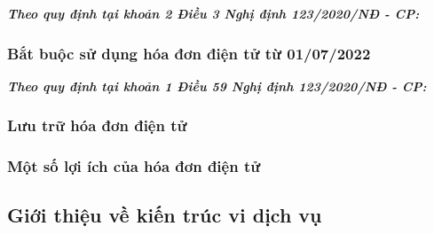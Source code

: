\documentclass{article} %
\begin{document}
\textbf{\textit{Theo quy định tại khoản 2 Điều 3 Nghị định 123/2020/NĐ - CP:}}



\subsubsection{Bắt buộc sử dụng hóa đơn điện tử từ 01/07/2022}

\textbf{\textit{Theo quy định tại khoản 1 Điều 59 Nghị định 123/2020/NĐ - CP:}}



\subsubsection{Lưu trữ hóa đơn điện tử}




\subsubsection{Một số lợi ích của hóa đơn điện tử}



\subsection{Giới thiệu về kiến trúc vi dịch vụ}


% 


% 


% 
\end{document}
